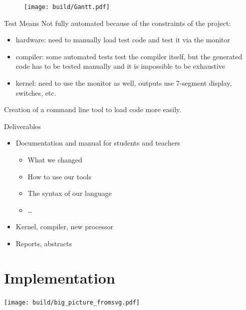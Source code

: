 \documentclass{beamer}
\begin{document}
      \begin{frame}[plain]
        \begin{figure}
          \texttt{[image: build/Gantt.pdf]}
        \end{figure}
      \end{frame}

      \begin{frame}{Test Means}
        Not fully automated because of the constraints of the project:
        \begin{itemize}
          \item hardware: need to manually load test code and test it via the
            monitor
          \item compiler: some automated tests test the compiler itself, but the
            generated code has to be tested manually and it is impossible to be
            exhaustive
          \item kernel: need to use the monitor as well, outputs use 7-segment
            display, switches, etc.
        \end{itemize}

        Creation of a command line tool to load code more easily.
      \end{frame}

      \begin{frame}{Deliverables}
        \begin{itemize}
          \item Documentation and manual for students and teachers
            \begin{itemize}
              \item What we changed
              \item How to use our tools
              \item The syntax of our language
              \item \dots
            \end{itemize}
          \item Kernel, compiler, new processor
          \item Reports, abstracts
        \end{itemize}
      \end{frame}

  \section{Implementation}
    \begin{frame}
      \texttt{[image: build/big\_picture\_fromsvg.pdf]}
    \end{frame}
\end{document}
